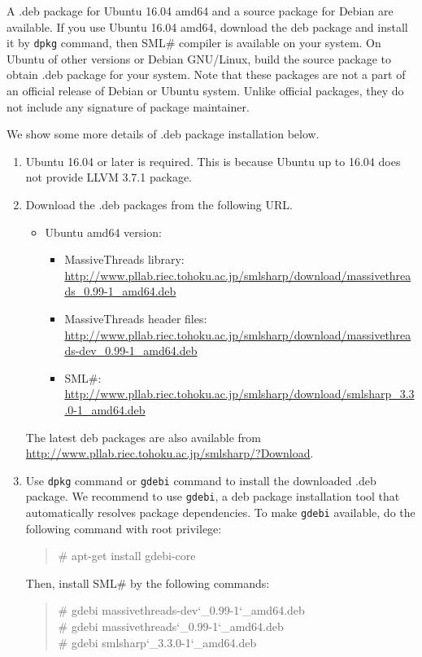 \documentclass{jbook}
\newcommand{\smlsharp}{SML\#}
\newcommand{\version}{3.3.0}
\newcommand\eurl[1]{{\edef\eurlTMP{{#1}}\expandafter\url\eurlTMP}}
\newenvironment{program}{\begin{quote}\begin{tt}}%
                        {\end{tt}\end{quote}}
\begin{document}
\else%

	A \mbox{.deb} package for Ubuntu 16.04 amd64 and
a source package for Debian are available.
	If you use Ubuntu 16.04 amd64, download the \mbox{deb} package
and install it by {\tt dpkg} command, then 
\smlsharp{} compiler is available on your system.
	On Ubuntu of other versions or Debian GNU/Linux, build the
source package to obtain \mbox{.deb} package for your system.
	Note that these packages are not a part of an official
release of Debian or Ubuntu system.
	Unlike official packages, they do not include any signature of
package maintainer.

	We show some more details of \mbox{.deb} package installation
below.

\begin{enumerate}
\item Ubuntu 16.04 or later is required.
	This is because Ubuntu up to 16.04 does not provide LLVM 3.7.1
package.
\item Download the \mbox{.deb} packages from the following URL.
\begin{itemize}
\item Ubuntu amd64 version:
\begin{itemize}
\item MassiveThreads library:
\eurl{http://www.pllab.riec.tohoku.ac.jp/smlsharp/download/massivethreads_0.99-1_amd64.deb}
\item MassiveThreads header files:
\eurl{http://www.pllab.riec.tohoku.ac.jp/smlsharp/download/massivethreads-dev_0.99-1_amd64.deb}
\item \smlsharp{}:
\eurl{http://www.pllab.riec.tohoku.ac.jp/smlsharp/download/smlsharp_\version-1_amd64.deb}
\end{itemize}
\end{itemize}
	The latest deb packages are also available from
\url{http://www.pllab.riec.tohoku.ac.jp/smlsharp/?Download}.
\item
	Use {\tt dpkg} command or {\tt gdebi} command to install
the downloaded \mbox{.deb} package.
	We recommend to use {\tt gdebi}, a deb package installation
tool that automatically resolves package dependencies.
	To make {\tt gdebi} available, do the following command with
root privilege:
\begin{program}
\# apt-get install gdebi-core
\end{program}
	Then, install \smlsharp{} by the following commands:
\begin{program}
\# gdebi massivethreads-dev\char`\_0.99-1\char`\_amd64.deb\\
\# gdebi massivethreads\char`\_0.99-1\char`\_amd64.deb\\
\# gdebi smlsharp\char`\_\version{}-1\char`\_amd64.deb
\end{program}


\end{enumerate}
\end{document}
